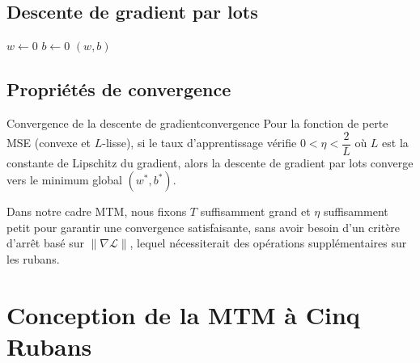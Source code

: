 \documentclass[12pt, a4paper, oneside]{report}
\begin{document}
\section{Descente de gradient par lots}

\begin{algorithm}[H]
  \DontPrintSemicolon
  \caption{Descente de gradient par lots (Batch Gradient Descent)}
  \label{alg:bgd}
  \BlankLine
  $w \leftarrow 0$\;
  $b \leftarrow 0$\;
  \Return $(w, b)$\;
\end{algorithm}

\section{Propriétés de convergence}

\begin{prop}{Convergence de la descente de gradient}{convergence}
  Pour la fonction de perte MSE (convexe et $L$-lisse), si le taux d'apprentissage vérifie $0 < \eta < \dfrac{2}{L}$ où $L$ est la constante de Lipschitz du gradient, alors la descente de gradient par lots converge vers le minimum global $(w^*, b^*)$.
\end{prop}

Dans notre cadre MTM, nous fixons $T$ suffisamment grand et $\eta$ suffisamment petit pour garantir une convergence satisfaisante, sans avoir besoin d'un critère d'arrêt basé sur $\|\nabla \mathcal{L}\|$, lequel nécessiterait des opérations supplémentaires sur les rubans.

\chapter{Conception de la MTM à Cinq Rubans}
\end{document}
